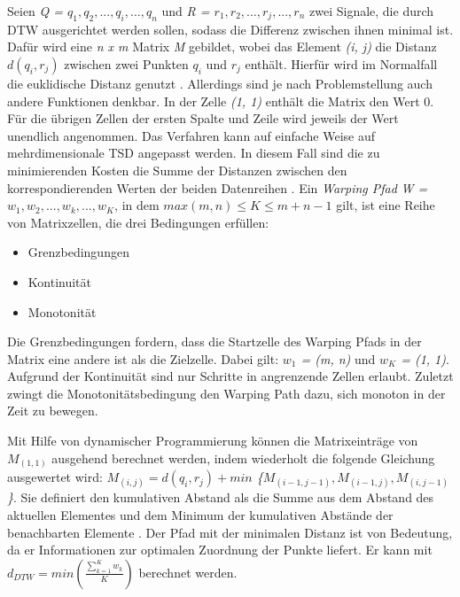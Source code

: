 Seien \emph{Q = $q_{1}, q_{2}, ... , q_{i}, ... , q_{n}$} und \emph{R = $r_{1}, r_{2}, ... , r_{j}, ... , r_{n}$}
zwei Signale, die durch \ac{DTW} ausgerichtet werden sollen, sodass die Differenz zwischen ihnen minimal ist.
Dafür wird eine \emph{n x m} Matrix \emph{M} gebildet, wobei das Element \emph{(i, j)} die Distanz \emph{$d(q_{i}, r_{j})$}
zwischen zwei Punkten \emph{$q_{i}$} und \emph{$r_{j}$} enthält.
Hierfür wird im Normalfall die euklidische Distanz genutzt \citep{warren_liao_clustering_2005}.
Allerdings sind je nach Problemstellung auch andere Funktionen denkbar.
In der Zelle \emph{(1, 1)} enthält die Matrix den Wert 0.
Für die übrigen Zellen der ersten Spalte und Zeile wird jeweils der Wert unendlich angenommen.
Das Verfahren kann auf einfache Weise auf mehrdimensionale \ac{TSD} angepasst werden.
In diesem Fall sind die zu minimierenden Kosten die Summe
der Distanzen zwischen den korrespondierenden Werten der beiden Datenreihen \citep{mohammadzade_dynamic_2021}.
Ein \emph{Warping Pfad} \emph{W = $w_{1}, w_{2}, ... , w_{k}, ... , w_{K}$}, in dem \emph{$max(m, n) \le K \le m + n - 1$} gilt,
ist eine Reihe von Matrixzellen, die drei Bedingungen erfüllen:
\begin{itemize}
    \item Grenzbedingungen
    \item Kontinuität
    \item Monotonität
\end{itemize}
Die Grenzbedingungen fordern, dass die Startzelle des Warping Pfads in der Matrix eine andere ist als die Zielzelle.
Dabei gilt: \emph{$w_{1}$ = (m, n)} und \emph{$w_{K}$ = (1, 1)}.
Aufgrund der Kontinuität sind nur Schritte in angrenzende Zellen erlaubt.
Zuletzt zwingt die Monotonitätsbedingung den Warping Path dazu, sich monoton in der Zeit zu bewegen.

Mit Hilfe von dynamischer Programmierung können die Matrixeinträge von \emph{$M_{(1, 1)}$} ausgehend berechnet werden,
indem wiederholt die folgende Gleichung ausgewertet wird:
\emph{$ M_{(i, j)} = d(q_{i}, r_{j}) + min $ \{$M_{(i - 1, j - 1)}, M_{(i - 1, j)}, M_{(i, j - 1)} $\}}.
Sie definiert den kumulativen Abstand als die Summe aus dem Abstand des aktuellen Elementes
und dem Minimum der kumulativen Abstände der benachbarten Elemente \citep{warren_liao_clustering_2005}.
Der Pfad mit der minimalen Distanz ist von Bedeutung,
da er Informationen zur optimalen Zuordnung der Punkte liefert.
Er kann mit \emph{$d_{DTW} = min(\frac{\sum_{k = 1}^{K}w_{k}}{K})$} berechnet werden.


